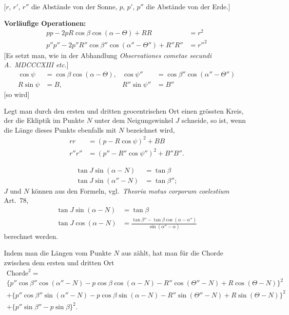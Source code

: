\documentclass[12pt,a4paper]{article}
\begin{document}
[$r$, $r'$, $r''$ die Abst\"ande von der Sonne,
$p$, $p'$, $p''$ die Abst\"ande von der Erde.]

\textbf{Vorl\"aufige Operationen:}
\begin{align*}
pp - 2pR\cos\beta\cos(\alpha - \Theta) + RR &= r^2 \\
p''p'' - 2p''R''\cos\beta''\cos(\alpha'' - \Theta'') + R''R'' &= r''^2
\end{align*}
[Es setzt man, wie in der Abhandlung \textit{Observationes cometae secundi A.~MDCCCXIII etc.}]
\begin{align*}
\cos\psi &= \cos\beta\cos(\alpha - \Theta), & \cos\psi'' &= \cos\beta''\cos(\alpha'' - \Theta'') \\
R\sin\psi &= B, & R''\sin\psi'' &= B''
\end{align*}
[so wird]

\newpage

Legt man durch den ersten und dritten geocentrischen Ort einen gr\"ossten
Kreis, der die Ekliptik im Punkte $N$ unter dem Neigungswinkel $J$ schneide,
so ist, wenn die L\"ange dieses Punkts ebenfalls mit $N$ bezeichnet wird,
\begin{align*}
rr &= (p - R\cos\psi)^2 + BB \\
r''r'' &= (p'' - R''\cos\psi'')^2 + B''B''.
\end{align*}

\begin{align*}
\tan J\sin(\alpha - N) &= \tan\beta \\
\tan J\sin(\alpha'' - N) &= \tan\beta'';
\end{align*}
$J$ und $N$ k\"onnen aus den Formeln, vgl.~\textit{Theoria motus corporum coelestium}
Art.~78,
\begin{align*}
\tan J\sin(\alpha - N) &= \tan\beta \\
\tan J\cos(\alpha - N) &= \frac{\tan\beta'' - \tan\beta\cos(\alpha - \alpha'')}{\sin(\alpha'' - \alpha)}
\end{align*}
berechnet werden.

Indem man die L\"angen vom Punkte $N$ aus z\"ahlt, hat man f\"ur die Chorde
zwischen dem ersten und dritten Ort
\begin{multline*}
\text{Chorde}^2 = \\
\{p''\cos\beta''\cos(\alpha'' - N) - p\cos\beta\cos(\alpha - N) - R''\cos(\Theta'' - N) + R\cos(\Theta - N)\}^2 \\
+ \{p''\cos\beta''\sin(\alpha'' - N) - p\cos\beta\sin(\alpha - N) - R''\sin(\Theta'' - N) + R\sin(\Theta - N)\}^2 \\
+ \{p''\sin\beta'' - p\sin\beta\}^2.
\end{multline*}
\end{document}
